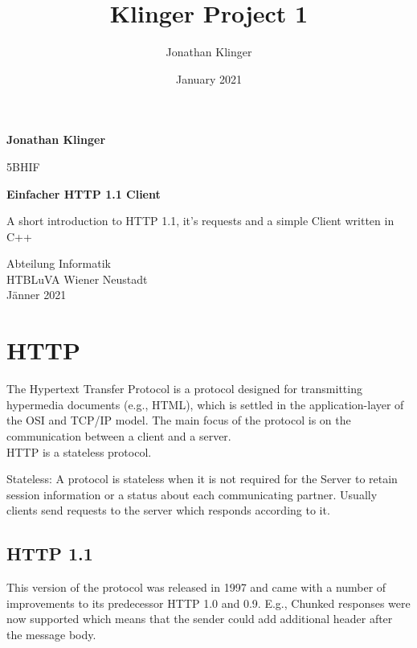 \documentclass{article}
\title{Klinger Project 1}
\author{Jonathan Klinger }
\date{January 2021}
\begin{document}
\begin{titlepage}
    \begin{center}
        \vspace*{1cm}
            
        \Huge
        \textbf{Jonathan Klinger}
            
        \vspace{0.5cm}
        \LARGE
        5BHIF
            
        \vspace{1.5cm}
            
        \textbf{Einfacher HTTP 1.1 Client}
            
        \vfill
            
        A short introduction to HTTP 1.1, it's requests and a simple Client written in C++
            
        \vspace{0.8cm}
            
        \Large
        Abteilung Informatik\\
        HTBLuVA Wiener Neustadt\\
        Jänner 2021
            
    \end{center}
\end{titlepage}

\tableofcontents
\pagebreak

\section{HTTP}

The Hypertext Transfer Protocol is a protocol designed for transmitting hypermedia documents (e.g., HTML), which is settled in the application-layer of the OSI and TCP/IP model. The main focus of the protocol is on the communication between a client and a server. 
\\
HTTP is a stateless protocol.

\begin{center} Stateless: A protocol is stateless when it is not required for the Server to retain session information or a status about each communicating partner. Usually clients send requests to the server which responds according to it. 
\end{center}

\subsection{HTTP 1.1}
This version of the protocol was released in 1997 and came with a number of improvements to its predecessor HTTP 1.0 and 0.9. E.g., Chunked responses were now supported which means that the sender could add additional header after the message body.
\end{document}
